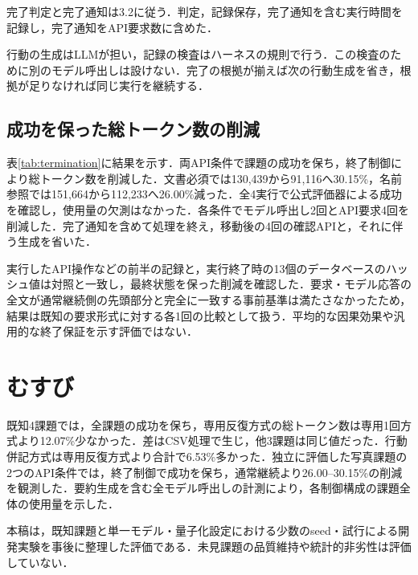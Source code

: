 \documentclass[letter]{ieicej}
\begin{document}
完了判定と完了通知は3.2に従う．判定，記録保存，完了通知を含む実行時間を記録し，完了通知をAPI要求数に含めた．

行動の生成はLLMが担い，記録の検査はハーネスの規則で行う．この検査のために別のモデル呼出しは設けない．完了の根拠が揃えば次の行動生成を省き，根拠が足りなければ同じ実行を継続する．

\subsection{成功を保った総トークン数の削減}

表\ref{tab:termination}に結果を示す．両API条件で課題の成功を保ち，終了制御により総トークン数を削減した．文書必須では130,439から91,116へ30.15\%，名前参照では151,664から112,233へ26.00\%減った．全4実行で公式評価器による成功を確認し，使用量の欠測はなかった．各条件でモデル呼出し2回とAPI要求4回を削減した．完了通知を含めて処理を終え，移動後の4回の確認APIと，それに伴う生成を省いた．

\TerminationResultsTable

\par\noindent\begin{minipage}{\columnwidth}
実行したAPI操作などの前半の記録と，実行終了時の13個のデータベースのハッシュ値は対照と一致し，最終状態を保った削減を確認した．要求・モデル応答の全文が通常継続側の先頭部分と完全に一致する事前基準は満たさなかったため，結果は既知の要求形式に対する各1回の比較として扱う．平均的な因果効果や汎用的な終了保証を示す評価ではない．
\end{minipage}\par{}

\section{むすび}

既知4課題では，全課題の成功を保ち，専用反復方式の総トークン数は専用1回方式より12.07\%少なかった．差はCSV処理で生じ，他3課題は同じ値だった．行動併記方式は専用反復方式より合計で6.53\%多かった．独立に評価した写真課題の2つのAPI条件では，終了制御で成功を保ち，通常継続より26.00--30.15\%の削減を観測した．要約生成を含む全モデル呼出しの計測により，各制御構成の課題全体の使用量を示した．

本稿は，既知課題と単一モデル・量子化設定における少数のseed・試行による開発実験を事後に整理した評価である．未見課題の品質維持や統計的非劣性は評価していない．


\end{document}
